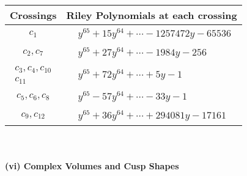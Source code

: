\documentclass[1p]{elsarticle_modified}
\theoremstyle{definition}
\begin{document}
\begin{tabular}{m{50pt}|m{274pt}}
Crossings & \hspace{64pt}Riley Polynomials at each crossing \\
\hline $$\begin{aligned}c_{1}\end{aligned}$$&$\begin{aligned}
&y^{65}+15 y^{64}+\cdots-1257472 y-65536
\end{aligned}$\\
\hline $$\begin{aligned}c_{2},c_{7}\end{aligned}$$&$\begin{aligned}
&y^{65}+27 y^{64}+\cdots-1984 y-256
\end{aligned}$\\
\hline $$\begin{aligned}c_{3},c_{4},c_{10}\\c_{11}\end{aligned}$$&$\begin{aligned}
&y^{65}+72 y^{64}+\cdots+5 y-1
\end{aligned}$\\
\hline $$\begin{aligned}c_{5},c_{6},c_{8}\end{aligned}$$&$\begin{aligned}
&y^{65}-57 y^{64}+\cdots-33 y-1
\end{aligned}$\\
\hline $$\begin{aligned}c_{9},c_{12}\end{aligned}$$&$\begin{aligned}
&y^{65}+36 y^{64}+\cdots+294081 y-17161
\end{aligned}$\\
\hline
\end{tabular}\\~\\
\newpage\flushleft \textbf{(vi) Complex Volumes and Cusp Shapes}
\end{document}
